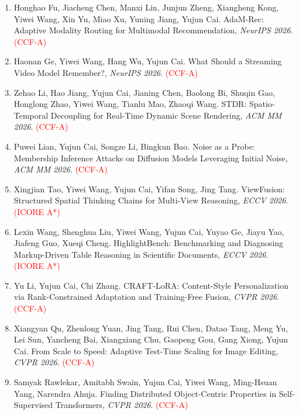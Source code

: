 \begin{enumerate}
\item Honghao Fu, Jiacheng Chen, Manxi Lin, Junjun Zheng, Xiangheng Kong, Yiwei Wang, Xin Yu, Miao Xu, Yuning Jiang, Yujun Cai. AdaM-Rec: Adaptive Modality Routing for Multimodal Recommendation, \textit{NeurIPS 2026}. \textcolor{red}{(CCF-A)}

\item Haonan Ge, Yiwei Wang, Hang Wu, Yujun Cai. What Should a Streaming Video Model Remember?, \textit{NeurIPS 2026}. \textcolor{red}{(CCF-A)}

\item Zehao Li, Hao Jiang, Yujun Cai, Jianing Chen, Baolong Bi, Shuqin Gao, Honglong Zhao, Yiwei Wang, Tianlu Mao, Zhaoqi Wang. STDR: Spatio-Temporal Decoupling for Real-Time Dynamic Scene Rendering, \textit{ACM MM 2026}. \textcolor{red}{(CCF-A)}

\item Puwei Lian, Yujun Cai, Songze Li, Bingkun Bao. Noise as a Probe: Membership Inference Attacks on Diffusion Models Leveraging Initial Noise, \textit{ACM MM 2026}. \textcolor{red}{(CCF-A)}

\item Xingjian Tao, Yiwei Wang, Yujun Cai, Yifan Song, Jing Tang. ViewFusion: Structured Spatial Thinking Chains for Multi-View Reasoning, \textit{ECCV 2026}. \textcolor{red}{(ICORE A*)}

\item Lexin Wang, Shenghua Liu, Yiwei Wang, Yujun Cai, Yuyao Ge, Jiayu Yao, Jiafeng Guo, Xueqi Cheng. HighlightBench: Benchmarking and Diagnosing Markup-Driven Table Reasoning in Scientific Documents, \textit{ECCV 2026}. \textcolor{red}{(ICORE A*)}

\item Yu Li, Yujun Cai, Chi Zhang. CRAFT-LoRA: Content-Style Personalization via Rank-Constrained Adaptation and Training-Free Fusion, \textit{CVPR 2026}. \textcolor{red}{(CCF-A)}

\item Xiangyan Qu, Zhenlong Yuan, Jing Tang, Rui Chen, Datao Tang, Meng Yu, Lei Sun, Yancheng Bai, Xiangxiang Chu, Gaopeng Gou, Gang Xiong, Yujun Cai. From Scale to Speed: Adaptive Test-Time Scaling for Image Editing, \textit{CVPR 2026}. \textcolor{red}{(CCF-A)}

\item Samyak Rawlekar, Amitabh Swain, Yujun Cai, Yiwei Wang, Ming-Hsuan Yang, Narendra Ahuja. Finding Distributed Object-Centric Properties in Self-Supervised Transformers, \textit{CVPR 2026}. \textcolor{red}{(CCF-A)}


\end{enumerate}
